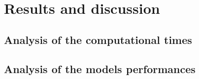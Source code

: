 
\section{Results and discussion}
\label{subsec:results}

\subsection{Analysis of the computational times}

\subsection{Analysis of the models performances}

